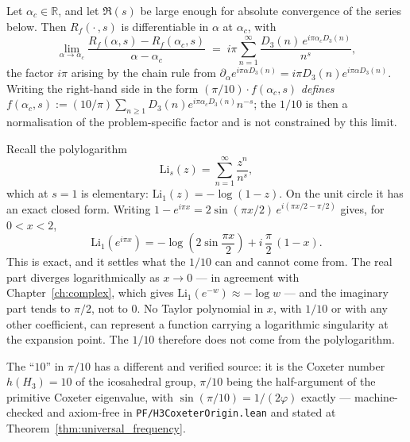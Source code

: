 \begin{thm}\label{thm:pi-ten-scaling}
Let $\alpha_c \in \mathbb{R}$, and let $\Re(s)$ be large enough for absolute
convergence of the series below. Then $R_f(\cdot\,, s)$ is differentiable in
$\alpha$ at $\alpha_c$, with
\begin{equation}
\label{eq:pi-ten-scaling-exact}
\lim_{\alpha \to \alpha_c} \frac{R_f(\alpha, s) - R_f(\alpha_c, s)}{\alpha - \alpha_c}
  \;=\; i\pi \sum_{n=1}^{\infty} \frac{D_3(n)\, e^{i\pi \alpha_c D_3(n)}}{n^{s}},
\end{equation}
the factor $i\pi$ arising by the chain rule from
$\partial_\alpha e^{i\pi \alpha D_3(n)} = i\pi D_3(n) e^{i\pi \alpha D_3(n)}$.
Writing the right-hand side in the form $(\pi/10)\cdot f(\alpha_c, s)$
\emph{defines}
$f(\alpha_c, s) := (10/\pi)\sum_{n \geq 1} D_3(n) e^{i\pi \alpha_c D_3(n)} n^{-s}$;
the $1/10$ is then a normalisation of the problem-specific factor and is not
constrained by this limit.
\end{thm}

\begin{level2}
Recall the polylogarithm
\begin{equation}
\text{Li}_s(z) = \sum_{n=1}^\infty \frac{z^n}{n^s},
\end{equation}
which at $s = 1$ is elementary: $\text{Li}_1(z) = -\log(1-z)$. On the unit circle
it has an exact closed form. Writing
$1 - e^{i\pi x} = 2\sin(\pi x/2)\,e^{i(\pi x/2 - \pi/2)}$ gives, for $0 < x < 2$,
\begin{equation}
\label{eq:li1-closed-form}
\text{Li}_1(e^{i\pi x}) = -\log\!\left(2 \sin \frac{\pi x}{2}\right)
   + i\,\frac{\pi}{2}\,(1 - x).
\end{equation}
This is exact, and it settles what the $1/10$ can and cannot come from. The real
part diverges logarithmically as $x \to 0$ --- in agreement with
Chapter~\ref{ch:complex}, which gives $\text{Li}_1(e^{-w}) \approx -\log w$ ---
and the imaginary part tends to $\pi/2$, not to $0$. No Taylor polynomial in $x$,
with $1/10$ or with any other coefficient, can represent a function carrying a
logarithmic singularity at the expansion point. The $1/10$ therefore does not
come from the polylogarithm.

The ``$10$'' in $\pi/10$ has a different and verified source: it is the Coxeter
number $h(H_3) = 10$ of the icosahedral group, $\pi/10$ being the half-argument
of the primitive Coxeter eigenvalue, with $\sin(\pi/10) = 1/(2\varphi)$ exactly
--- machine-checked and axiom-free in \texttt{PF/H3CoxeterOrigin.lean} and stated
at Theorem~\ref{thm:universal_frequency}.
\end{level2}

